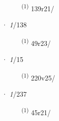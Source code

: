 \begin{description}
    \item[]  \textsuperscript{(1)} \mbox{139r21/}
\end{description}
\ENTRYEND
\noindent{} · \textit{1}/138 \LEMMALINE
\begin{description}
    \item[]  \textsuperscript{(1)} \mbox{49r23/}
\end{description}
\ENTRYEND
\noindent{} · \textit{1}/15 \LEMMALINE
\begin{description}
    \item[]  \textsuperscript{(1)} \mbox{220v25/}
\end{description}
\ENTRYEND
\noindent{} · \textit{1}/237 \LEMMALINE
\begin{description}
    \item[]  \textsuperscript{(1)} \mbox{45r21/}
\end{description}
\ENTRYEND
